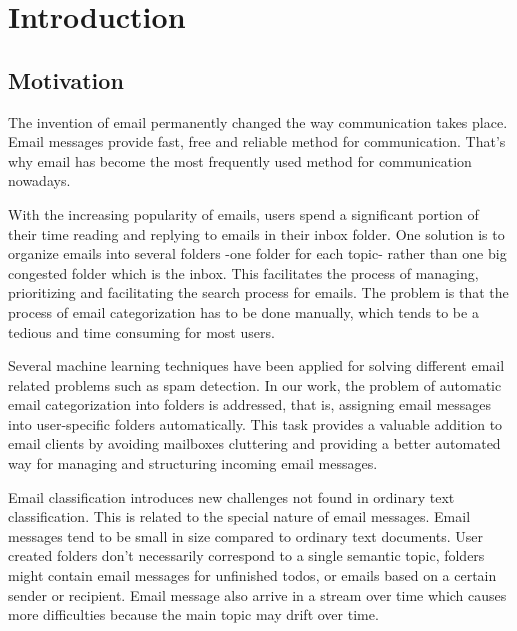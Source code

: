 
\chapter{Introduction} %

\label{Chapter1} %


\section{Motivation}

The invention of email permanently changed the way communication takes place. 
Email messages provide fast, free and reliable method for communication. 
That's why email has become the most frequently used method for communication 
nowadays.

With the increasing popularity of emails, users spend a significant portion of 
their time reading and replying to emails in their inbox folder. One solution 
is to organize emails into several folders -one folder for each topic- rather 
than one big congested folder which is the inbox. This facilitates the process 
of managing, prioritizing and facilitating the search process for emails. 
The problem is that the process of email categorization has to be done manually, 
which tends to be a tedious and time consuming for most users.

Several machine learning techniques have been applied for solving different 
email related problems such as spam detection. In our work, the problem of 
automatic email categorization into folders is addressed, that is, assigning 
email messages into user-specific folders automatically. This task provides 
a valuable addition to email clients by avoiding mailboxes cluttering and 
providing a better automated way for managing and structuring incoming email 
messages.

Email classification introduces new challenges not found in ordinary text 
classification. This is related to the special nature of email messages. Email 
messages tend to be small in size compared to ordinary text documents. User 
created folders don't necessarily correspond to a single semantic topic, 
folders might contain email messages for unfinished todos, or emails based on 
a certain sender or recipient. Email message also arrive in a stream over time 
which causes more difficulties because the main topic may drift over time.

